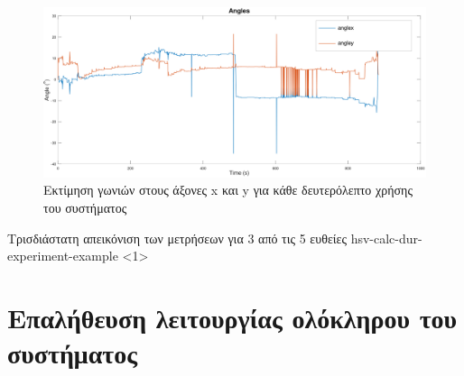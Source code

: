 \begin{figure}[H]
  \centering
  \includegraphics[width=\linewidth]{../Images/Experiments-Results/raspberry-exp-angles.png}
  \decoRule
  \caption[Εκτίμηση γωνιών στους άξονες x και y για κάθε δευτερόλεπτο χρήσης του συστήματος]{Εκτίμηση γωνιών στους άξονες x και y για κάθε δευτερόλεπτο χρήσης του συστήματος}
  \label{fig:angles-usage-experiment-example}
\end{figure}

{Τρισδιάστατη απεικόνιση των μετρήσεων για 3 από τις 5 ευθείες}%
{hsv-calc-dur-experiment-example}%
<1>

\section{Επαλήθευση λειτουργίας ολόκληρου του συστήματος}